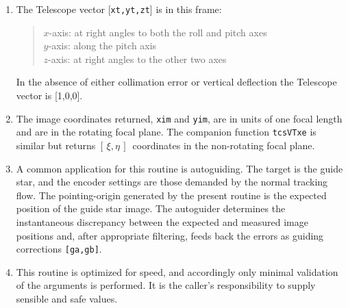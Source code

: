 \documentclass[12pt,fleqn,twoside]{article}
\renewcommand{\_}{{\tt\char'137}}     %
\newcommand{\radec}     {$[\,\alpha,\delta\,]$}
\newcommand{\hadec}     {$[\,h,\delta\,]$}
\newcommand{\xieta}     {$[\,\xi,\eta\,]$}
\newcommand{\azel}      {$[\,Az,El~]$}
\begin{document}
{\begin{enumerate}
\begin{tabbing}
         \> {\tt target } \> topocentric apparent \radec \\
         \> {\tt spm1   } \> identity matrix \\
         \> {\tt sst,cst} \> \radec\ $\Rightarrow$ \hadec \\
         \> {\tt spm2   } \> topocentric \hadec\ $\Rightarrow$ {\sc Aim}
      \end{tabbing}
      \begin{tabbing}
         xxx \= xxxxxxxxxx \= \kill
         \> {\tt frame  } \> {\tt AZEL\_TOPO} \\
         \> {\tt target } \> topocentric \azel\ (N thru E) \\
         \> {\tt spm1   } \> identity matrix \\
         \> {\tt sst,cst} \> not used \\
         \> {\tt spm2   } \> topocentric \azel\ $\Rightarrow$ {\sc Aim}
      \end{tabbing}

      ICRS $\approx$ FK5 J2000 to better than 25 mas.
\item The {\sc Telescope} vector [{\tt xt,yt,zt}] is in this frame:
      \begin{quote}
      $x$-axis:  at right angles to both the roll and pitch axes \\
      $y$-axis:  along the pitch axis \\
      $z$-axis:  at right angles to the other two axes
      \end{quote}
      In the absence of either collimation error or vertical deflection
      the {\sc Telescope} vector is [1,0,0].
\item The image coordinates returned,
       {\tt xim} and {\tt yim}, are in units of one
       focal length and are in the rotating focal plane.  The companion
       function {\tt tcsVTxe} is similar but returns
       \xieta\ coordinates in the
       non-rotating focal plane.
\item A common application for this routine is autoguiding.  The target
      is the guide star, and the encoder settings are those demanded by
      the normal tracking flow.  The pointing-origin generated by the
      present routine is the expected position of the guide star image.
      The autoguider determines the instantaneous discrepancy between
      the expected and measured image positions and, after appropriate
      filtering, feeds back the errors as guiding corrections
      {\tt [ga,gb]}.
\item This routine is optimized for speed, and accordingly only minimal
      validation of the arguments is performed.  It is the caller's
      responsibility to supply sensible and safe values.
\end{enumerate}
}
\end{document}

